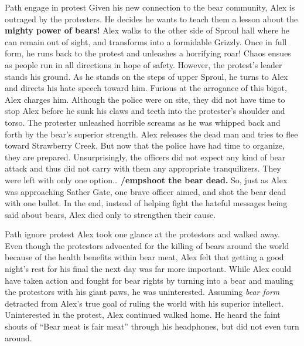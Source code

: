 \documentclass{article}
\begin{document}
Path engage in protest
Given his new connection to the bear community, Alex is outraged by the protesters. He decides he wants to teach them a lesson about the \textbf{mighty power of bears!} Alex walks to the other side of Sproul hall where he can remain out of sight, and transforms into a formidable Grizzly. Once in full form, he runs back to the protest and unleashes a horrifying roar! Chaos ensues as people run in all directions in hope of safety. However, the protest’s leader stands his ground. As he stands on the steps of upper Sproul, he turns to Alex and directs his hate speech toward him. Furious at the arrogance of this bigot, Alex charges him. Although the police were on site, they did not have time to stop Alex before he sunk his claws and teeth into the protester’s shoulder and torso. The protester unleashed horrible screams as he was whipped back and forth by the bear’s superior strength. Alex releases the dead man and tries to flee toward Strawberry Creek. But now that the police have had time to organize, they are prepared. Unsurprisingly, the officers did not expect any kind of bear attack and thus did not carry with them any appropriate tranquilizers. They were left with only one option… \textbf{/emp{shoot the bear dead.}} So, just as Alex was approaching Sather Gate, one brave officer aimed, and shot the bear dead with one bullet. In the end, instead of helping fight the hateful messages being said about bears, Alex died only to strengthen their cause. 







Path ignore protest
Alex took one glance at the protestors and walked away. Even though the protestors advocated for the killing of bears around the world because of the health benefits within bear meat, Alex felt that getting a good night’s rest for his final the next day was far more important. While Alex could have taken action and fought for bear rights by turning into a bear and mauling the protestors with his giant paws, he was uninterested. Assuming \textit {bear form} detracted from Alex’s true goal of ruling the world with his superior intellect. Uninterested in the protest, Alex continued walked home. He heard the faint shouts of “Bear meat is fair meat” through his headphones, but did not even turn around.
\end{document}
